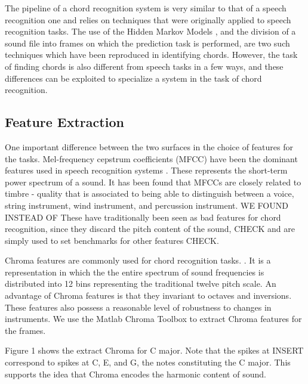 \documentclass{article}
\begin{document}
The pipeline of a chord recognition system is very similar to that of a speech recognition one and relies on techniques that were originally applied to speech recognition tasks. The use of the Hidden Markov Models \cite{young} , and the division of a sound file into frames on which the prediction task is performed, are two such techniques which have been reproduced in identifying chords. However, the task of finding chords is also different from speech tasks in a few ways, and these differences can be exploited to specialize a system in the task of chord recognition.

\subsection{Feature Extraction}

One important difference between the two surfaces in the choice of features for the tasks. Mel-frequency cepstrum coefficients (MFCC) have been the dominant features used in speech recognition systems \cite{young}. These represents the short-term power spectrum of a sound. It has been found that MFCCs are closely related to timbre - quality that is associated to being able to distinguish between a voice, string instrument, wind instrument, and percussion instrument. WE FOUND INSTEAD OF These have traditionally been seen as bad features for chord recognition, since they discard the pitch content of the sound, CHECK and are simply used to set benchmarks for other features CHECK.

Chroma features are commonly used for chord recognition tasks. \cite{fujishima}. It is a representation in which the the entire spectrum of sound frequencies is distributed into 12 bins representing the traditional twelve pitch scale. An advantage of Chroma features is that they invariant to octaves and inversions. These features also possess a reasonable level of robustness to changes in instruments. We use the Matlab Chroma Toolbox to extract Chroma features for the frames.

Figure 1 shows the extract Chroma for C major. Note that the spikes at INSERT correspond to spikes at C, E, and G, the notes constituting the C major. This supports the idea that Chroma encodes the harmonic content of sound.
\end{document}
